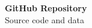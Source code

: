 \documentclass[final]{beamer}
\begin{document}
\begin{frame}[t]
\begin{columns}[T]
\begin{column}{0.23\linewidth}
    \vspace{1.5cm}
    \centering
    \vspace{0.3cm}
    
    \footnotesize
    \textbf{GitHub Repository}\\
    Source code and data
\end{column}
\end{columns}

\end{frame}
\end{document}
